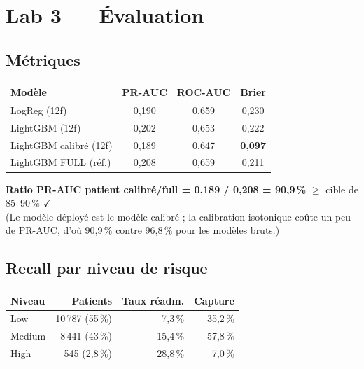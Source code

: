 \documentclass[11pt,a4paper]{article}
\begin{document}
\section{Lab 3 --- \'Evaluation}

\subsection{M\'etriques}

\begin{center}
\begin{tabular}{@{}lccc@{}}
\toprule
\textbf{Mod\`ele} & \textbf{PR-AUC} & \textbf{ROC-AUC} & \textbf{Brier} \\
\midrule
LogReg (12f) & 0{,}190 & 0{,}659 & 0{,}230 \\
LightGBM (12f) & 0{,}202 & 0{,}653 & 0{,}222 \\
LightGBM calibr\'e (12f) & 0{,}189 & 0{,}647 & \textbf{0{,}097} \\
LightGBM FULL (r\'ef.) & 0{,}208 & 0{,}659 & 0{,}211 \\
\bottomrule
\end{tabular}
\end{center}

\textbf{Ratio PR-AUC patient calibr\'e/full = 0{,}189 / 0{,}208 = 90{,}9\,\%} $\ge$ cible de 85--90\,\% $\checkmark$ \\
(Le mod\`ele d\'eploy\'e est le mod\`ele calibr\'e ; la calibration isotonique co\^ute un peu de PR-AUC, d'o\`u 90{,}9\,\% contre 96{,}8\,\% pour les mod\`eles bruts.)

\subsection{Recall par niveau de risque}

\begin{center}
\begin{tabular}{@{}lrrr@{}}
\toprule
\textbf{Niveau} & \textbf{Patients} & \textbf{Taux r\'eadm.} & \textbf{Capture} \\
\midrule
Low & 10\,787 (55\,\%) & 7{,}3\,\% & 35{,}2\,\% \\
Medium & 8\,441 (43\,\%) & 15{,}4\,\% & 57{,}8\,\% \\
High & 545 (2{,}8\,\%) & 28{,}8\,\% & 7{,}0\,\% \\
\bottomrule
\end{tabular}
\end{center}
\end{document}
